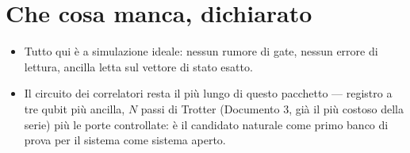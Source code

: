 \documentclass[11pt,a4paper]{article}
\begin{document}

\section{Che cosa manca, dichiarato}

\begin{itemize}[leftmargin=1.5em,itemsep=2pt]
\item Tutto qui è a simulazione ideale: nessun rumore di gate, nessun
errore di lettura, ancilla letta sul vettore di stato esatto.
\item Il circuito dei correlatori resta il più lungo di questo pacchetto
--- registro a tre qubit più ancilla, $N$ passi di Trotter (Documento 3,
già il più costoso della serie) più le porte controllate: è il candidato
naturale come primo banco di prova per il sistema come sistema aperto.
\end{itemize}
\end{document}
